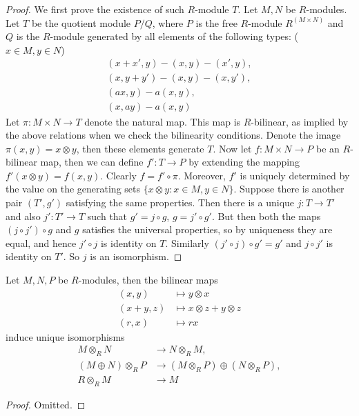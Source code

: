 \begin{proof}
We first prove the existence of such $R$-module $T$.
Let $M, N$ be $R$-modules.
Let $T$ be the quotient module
$P/Q$, where $P$ is the free $R$-module $R^{(M \times N)}$ and $Q$ is the
$R$-module generated by all elements of
the following types: ($x\in M, y\in N$)
\begin{align*}
(x + x', y) - (x, y) - (x', y), \\
(x, y + y') - (x, y) - (x, y'), \\
(ax, y) - a(x, y), \\
(x, ay) - a(x, y)
\end{align*}
Let $\pi : M \times N \to T$ denote the natural map.
This map is $R$-bilinear, as
implied by the above relations
when we check the bilinearity conditions. Denote the image
$\pi(x, y) = x \otimes
y$, then these elements generate
$T$. Now let $f : M \times N \to P$ be an $R$-bilinear map,
then we can define
$f' : T \to P$ by extending the mapping
$f'(x \otimes y) = f(x, y)$. Clearly $f = f'\circ \pi$. Moreover, $f'$ is
uniquely determined by the value on the
generating sets $\{x \otimes y : x\in M, y\in N\}$.
Suppose there is another pair $(T', g')$ satisfying the same properties.
Then there is a unique $j : T \to T'$ and
also $j' : T' \to T$ such that $g' = j\circ g$, $g = j'\circ g'$.
But then both the maps $(j\circ j') \circ g$ and $g$
satisfies the universal properties, so by uniqueness they are equal,
and hence $j'\circ j$ is identity on $T$.
Similarly $(j'\circ j) \circ g' = g'$ and $j\circ j'$ is identity on $T'$.
So $j$ is an isomorphism.
\end{proof}

\begin{lemma}
\label{lemma-flip-tensor-product}
Let $M, N, P$ be $R$-modules, then the bilinear maps
\begin{align*}
(x, y) & \mapsto y \otimes x\\
(x + y, z) & \mapsto x \otimes z + y \otimes z\\
(r, x) & \mapsto rx
\end{align*}
induce unique isomorphisms
\begin{align*}
M \otimes_R N & \to N \otimes_R M, \\
(M\oplus N)\otimes_R P & \to (M \otimes_R P)\oplus(N \otimes_R P),  \\
R \otimes_R M & \to M
\end{align*}
\end{lemma}

\begin{proof}
Omitted.
\end{proof}

